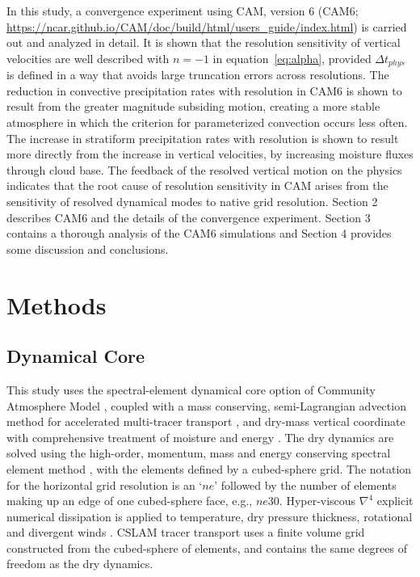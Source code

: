 \documentclass[times]{qjrms4}
\begin{document}
In this study, a convergence experiment using CAM, version 6 (CAM6; \url{https://ncar.github.io/CAM/doc/build/html/users_guide/index.html}) is carried out and analyzed in detail. It is shown that the resolution sensitivity of vertical velocities are well described with $n=-1$ in equation~\eqref{eq:alpha}, provided $\Delta t_{phys}$ is defined in a way that avoids large truncation errors across resolutions. The reduction in convective precipitation rates with resolution in CAM6 is shown to result from the greater magnitude subsiding motion, creating a more stable atmosphere in which the criterion for parameterized convection occurs less often. The increase in stratiform precipitation rates with resolution is shown to result more directly from the increase in vertical velocities, by increasing moisture fluxes through cloud base. The feedback of the resolved vertical motion on the physics indicates that the root cause of resolution sensitivity in CAM arises from the sensitivity of resolved dynamical modes to native grid resolution. Section 2 describes CAM6 and the details of the convergence experiment. Section 3 contains a thorough analysis of the CAM6 simulations and Section 4 provides some discussion and conclusions.

\section{Methods}

\subsection{Dynamical Core}

This study uses the spectral-element dynamical core option of Community Atmosphere Model \citep[CAM-SE;][]{DetAl2012IJHPCA}, coupled with a mass conserving, semi-Lagrangian advection method for accelerated multi-tracer transport \citep[CSLAM;][]{LTOUNGK2017MWR}, and dry-mass vertical coordinate with comprehensive treatment of moisture and energy \citep{LetAl2018JAMES}. The dry dynamics are solved using the high-order, momentum, mass and energy conserving spectral element method \citep{TF2010JCP}, with the elements defined by a cubed-sphere grid. The notation for the horizontal grid resolution is an `$ne$' followed by the number of elements making up an edge of one cubed-sphere face, e.g., $ne30$. Hyper-viscous $\nabla^{4}$ explicit numerical dissipation is applied to temperature, dry pressure thickness, rotational and divergent winds \citep{LetAl2018JAMES}. CSLAM tracer transport uses a finite volume grid constructed from the cubed-sphere of elements, and contains the same degrees of freedom as the dry dynamics.
\end{document}
